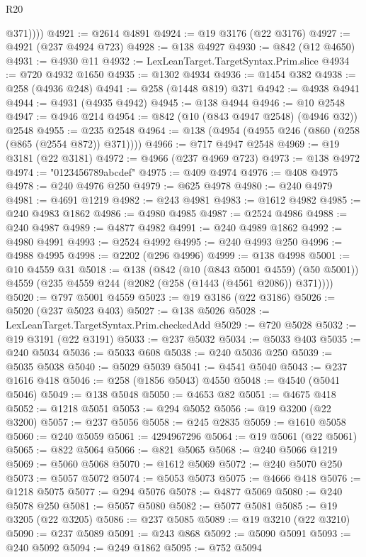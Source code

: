 \begin{lexlean}{R20}
\begin{coremodule}
{            @371))))
@4921 := @2614 @4891
@4924 := @19 @3176 (@22 @3176)
@4927 := @4921 (@237 @4924 @723)
@4928 := @138 @4927
@4930 := @842 (@12 @4650)
@4931 := @4930 @11
@4932 := LexLeanTarget.TargetSyntax.Prim.slice
@4934 := @720 @4932 @1650
@4935 := @1302 @4934
@4936 := @1454 @382
@4938 := @258 (@4936 @248)
@4941 := @258 (@1448 @819) @371
@4942 := @4938 @4941
@4944 := @4931 (@4935 @4942)
@4945 := @138 @4944
@4946 := @10 @2548
@4947 := @4946 @214
@4954 := @842 (@10 (@843 @4947 @2548) (@4946 @32)) @2548
@4955 := @235 @2548
@4964 := @138 (@4954 (@4955 @246 (@860 (@258 (@865 (@2554 @872)) @371))))
@4966 := @717 @4947 @2548
@4969 := @19 @3181 (@22 @3181)
@4972 := @4966 (@237 @4969 @723)
@4973 := @138 @4972
@4974 := "0123456789abcdef"
@4975 := @409 @4974
@4976 := @408 @4975
@4978 := @240 @4976 @250
@4979 := @625 @4978
@4980 := @240 @4979
@4981 := @4691 @1219
@4982 := @243 @4981
@4983 := @1612 @4982
@4985 := @240 @4983 @1862
@4986 := @4980 @4985
@4987 := @2524 @4986
@4988 := @240 @4987
@4989 := @4877 @4982
@4991 := @240 @4989 @1862
@4992 := @4980 @4991
@4993 := @2524 @4992
@4995 := @240 @4993 @250
@4996 := @4988 @4995
@4998 := @2202 (@296 @4996)
@4999 := @138 @4998
@5001 := @10 @4559 @31
@5018 := @138
    (@842
      (@10 (@843 @5001 @4559) (@50 @5001))
      @4559
      (@235 @4559 @244 (@2082 (@258 (@1443 (@4561 @2086)) @371))))
@5020 := @797 @5001 @4559
@5023 := @19 @3186 (@22 @3186)
@5026 := @5020 (@237 @5023 @403)
@5027 := @138 @5026
@5028 := LexLeanTarget.TargetSyntax.Prim.checkedAdd
@5029 := @720 @5028
@5032 := @19 @3191 (@22 @3191)
@5033 := @237 @5032
@5034 := @5033 @403
@5035 := @240 @5034
@5036 := @5033 @608
@5038 := @240 @5036 @250
@5039 := @5035 @5038
@5040 := @5029 @5039
@5041 := @4541 @5040
@5043 := @237 @1616 @418
@5046 := @258 (@1856 @5043) @4550
@5048 := @4540 (@5041 @5046)
@5049 := @138 @5048
@5050 := @4653 @82
@5051 := @4675 @418
@5052 := @1218 @5051
@5053 := @294 @5052
@5056 := @19 @3200 (@22 @3200)
@5057 := @237 @5056
@5058 := @245 @2835
@5059 := @1610 @5058
@5060 := @240 @5059
@5061 := 4294967296
@5064 := @19 @5061 (@22 @5061)
@5065 := @822 @5064
@5066 := @821 @5065
@5068 := @240 @5066 @1219
@5069 := @5060 @5068
@5070 := @1612 @5069
@5072 := @240 @5070 @250
@5073 := @5057 @5072
@5074 := @5053 @5073
@5075 := @4666 @418
@5076 := @1218 @5075
@5077 := @294 @5076
@5078 := @4877 @5069
@5080 := @240 @5078 @250
@5081 := @5057 @5080
@5082 := @5077 @5081
@5085 := @19 @3205 (@22 @3205)
@5086 := @237 @5085
@5089 := @19 @3210 (@22 @3210)
@5090 := @237 @5089
@5091 := @243 @868
@5092 := @5090 @5091
@5093 := @240 @5092
@5094 := @249 @1862
@5095 := @752 @5094
}
\end{coremodule}
\end{lexlean}
